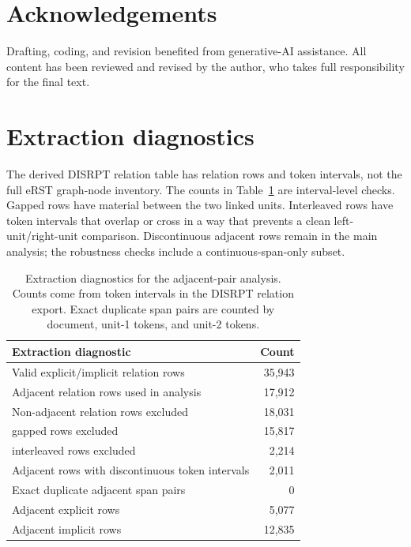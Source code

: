 \documentclass[12pt]{article}
\begin{document}
\clearpage
{}
\section*{Acknowledgements}

Drafting, coding, and revision benefited from generative-AI assistance. All
content has been reviewed and revised by the author, who takes full
responsibility for the final text.

\clearpage
\appendix

\section{Extraction diagnostics}
\label{app:extraction-diagnostics}

The derived DISRPT relation table has relation rows and token intervals,
not the full eRST graph-node inventory. The counts in
Table~\ref{tab:extraction-diagnostics} are interval-level checks. Gapped
rows have material between the two linked units. Interleaved rows have
token intervals that overlap or cross in a way that prevents a clean
left-unit/right-unit comparison. Discontinuous adjacent rows remain in the
main analysis; the robustness checks include a continuous-span-only subset.

\begin{table}[H]
\centering
\scriptsize
\begin{tabular}{lr}
\toprule
Extraction diagnostic & Count\\
\midrule
Valid explicit/implicit relation rows & 35,943\\
Adjacent relation rows used in analysis & 17,912\\
Non-adjacent relation rows excluded & 18,031\\
\quad gapped rows excluded & 15,817\\
\quad interleaved rows excluded & 2,214\\
Adjacent rows with discontinuous token intervals & 2,011\\
Exact duplicate adjacent span pairs & 0\\
Adjacent explicit rows & 5,077\\
Adjacent implicit rows & 12,835\\
\bottomrule
\end{tabular}
\caption{Extraction diagnostics for the adjacent-pair analysis. Counts
come from token intervals in the DISRPT relation export. Exact duplicate
span pairs are counted by document, unit-1 tokens, and unit-2 tokens.}
\label{tab:extraction-diagnostics}
\end{table}
\end{document}
